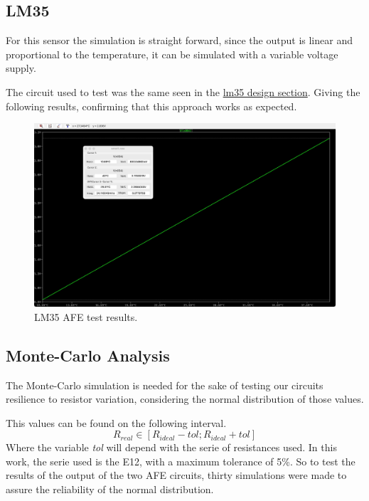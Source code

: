 \documentclass[12pt]{article}
\begin{document}
\subsection{LM35}

    For this sensor the simulation is straight forward, since the output is linear and proportional to the temperature, 
    it can be simulated with a variable voltage supply. 
    
    The circuit used to test was the same seen in the \hyperref[AFELM35]{lm35 design section}.
    Giving the following results, confirming that this approach works as expected. 
    
    \begin{figure}[H] 
        \centering
        \includegraphics*[scale = 0.15]{images/LM35AFERes.jpeg}
        \caption{LM35 AFE test results.}
        \label{wrap-fig:1}
    \end{figure}

\subsection{Monte-Carlo Analysis} 
    
    The Monte-Carlo simulation is needed for the sake of testing our circuits resilience to resistor variation, considering 
    the normal distribution of those values. 

    This values can be found on the following interval.
    \begin{equation}
        R_{real} \in [R_{ideal} - tol; R_{ideal} + tol] 
    \end{equation}
    Where the variable \textit{tol} will depend with the serie of resistances used. 
    In this work, the serie used is the E12, with a maximum tolerance of 5\%. So to test the results of
    the output of the two AFE circuits, thirty simulations were made to assure the reliability of the normal distribution.
\end{document}
